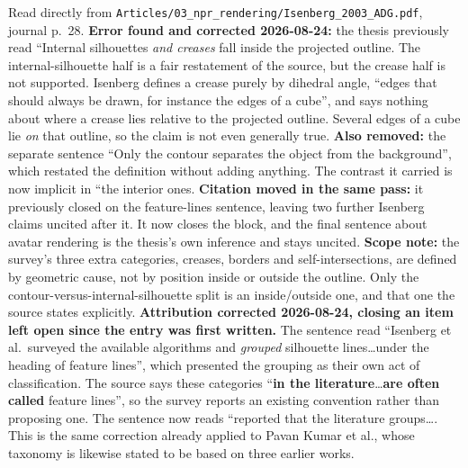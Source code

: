 \documentclass[11pt, a4paper]{article}
\begin{document}
\begin{Form}
  {Read directly from \texttt{\footnotesize Articles/03\_npr\_rendering/Isenberg\_2003\_ADG.pdf}, journal p.~28. \textbf{Error found and corrected 2026-08-24:} the thesis previously read ``Internal silhouettes \emph{and creases} fall inside the projected outline. The internal-silhouette half is a fair restatement of the source, but the crease half is not supported. Isenberg defines a crease purely by dihedral angle, ``edges that should always be drawn, for instance the edges of a cube'', and says nothing about where a crease lies relative to the projected outline. Several edges of a cube lie \emph{on} that outline, so the claim is not even generally true. \textbf{Also removed:} the separate sentence ``Only the contour separates the object from the background'', which restated the definition without adding anything. The contrast it carried is now implicit in ``the interior ones. \textbf{Citation moved in the same pass:} it previously closed on the feature-lines sentence, leaving two further Isenberg claims uncited after it. It now closes the block, and the final sentence about avatar rendering is the thesis's own inference and stays uncited. \textbf{Scope note:} the survey's three extra categories, creases, borders and self-intersections, are defined by geometric cause, not by position inside or outside the outline. Only the contour-versus-internal-silhouette split is an inside/outside one, and that one the source states explicitly. \textbf{Attribution corrected 2026-08-24, closing an item left open since the entry was first written.} The sentence read ``Isenberg et al.\ surveyed the available algorithms and \emph{grouped} silhouette lines\ldots under the heading of feature lines'', which presented the grouping as their own act of classification. The source says these categories ``\textbf{in the literature}\ldots \textbf{are often called} feature lines'', so the survey reports an existing convention rather than proposing one. The sentence now reads ``reported that the literature groups\ldots. This is the same correction already applied to Pavan Kumar et al., whose taxonomy is likewise stated to be based on three earlier works.}


\end{Form}
\end{document}

